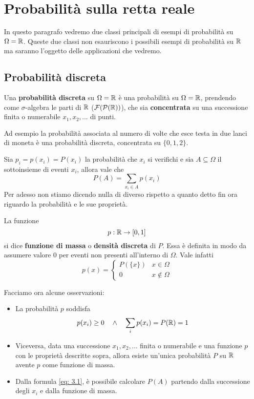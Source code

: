 \section{Probabilità sulla retta reale}
In questo paragrafo vedremo due classi principali di esempi di probabilità su $\Omega = \mathbb{R}$.
Queste due classi non esauriscono i possibili esempi di probabilità su $\mathbb{R}$ ma saranno l'oggetto
delle applicazioni che vedremo.

\subsection{Probabilità discreta}
Una \textbf{probabilità discreta} su $\Omega = \mathbb{R}$ è una probabilità su $\Omega = \mathbb{R}$, prendendo
come $\sigma$-algebra le parti di $\mathbb{R}$ ($\mathcal{F} (\mathcal{P}(\mathbb{R}))$), che sia \textbf{concentrata} su
una successione finita o numerabile $x_1, x_2, \dots$ di punti.

Ad esempio la probabilità associata al numero di volte che esce testa in due lanci di moneta è
una probabilità discreta, concentrata su $\{0,1,2\}$.

Sia $p_i = p(x_i) = P(x_i)$ la probabilità che $x_i$ si verifichi e sia $A \subseteq \Omega$
il sottoinsieme di eventi $x_i$, allora vale che
\begin{equation}\label{eq: 3.1}
	P(A) = \sum_{x_i \in A} p(x_i)
\end{equation}
Per adesso non stiamo dicendo nulla di diverso rispetto a quanto detto fin ora riguardo la
probabilità e le sue proprietà.

\begin{definition}
	La funzione
	\[ p : \mathbb{R} \to [0,1] \]
	si dice \textbf{funzione di massa} o \textbf{densità discreta} di $P$. Essa è definita in modo
	da assumere valore 0 per eventi non presenti all'interno di $\Omega$. Vale infatti
	\[
		p(x) = \begin{cases}
			P(\{ x \}) & x \in \Omega    \\[1ex]
			0          & x \notin \Omega
		\end{cases}
	\]
\end{definition}

\begin{observation}
	Facciamo ora alcune osservazioni:
	\begin{itemize}
		\item La probabilità $p$ soddisfa
		      \[ p(x_i) \geq 0 \quad \land \quad \sum_i p(x_i) = P(\mathbb{R}) = 1 \]
		\item Viceversa, data una successione $x_1, x_2, \dots$ finita o numerabile e una funzione
		      $p$ con le proprietà descritte sopra, allora esiste un'unica probabilità $P$ su $\mathbb{R}$
		      avente $p$ come funzione di massa.
		\item Dalla formula \ref{eq: 3.1}, è possibile calcolare $P(A)$ partendo dalla successione
		      degli $x_i$ e dalla funzione di massa.
	\end{itemize}
\end{observation}

